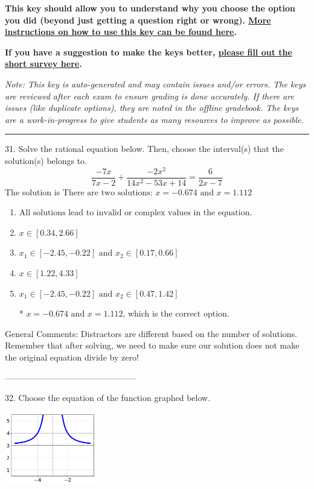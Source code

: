 \documentclass{article}[14pt]
\begin{document}
\textbf{This key should allow you to understand why you choose the option you did (beyond just getting a question right or wrong). \href{https://xronos.clas.ufl.edu/mac1105spring2020/courseDescriptionAndMisc/Exams/LearningFromResults}{More instructions on how to use this key can be found here}.}

\textbf{If you have a suggestion to make the keys better, \href{https://forms.gle/CZkbZmPbC9XALEE88}{please fill out the short survey here}.}

\textit{Note: This key is auto-generated and may contain issues and/or errors. The keys are reviewed after each exam to ensure grading is done accurately. If there are issues (like duplicate options), they are noted in the offline gradebook. The keys are a work-in-progress to give students as many resources to improve as possible.}

\rule{\textwidth}{0.4pt}

31. Solve the rational equation below. Then, choose the interval(s) that the solution(s) belongs to.
$$ \frac{-7x}{7x -2} + \frac{-2x^{2}}{14x^{2} -53 x + 14} = \frac{6}{2x -7} $$ 
The solution is $ \text{There are two solutions: } x = -0.674 \text{ and } x = 1.112 $ 

\begin{enumerate}[label=\Alph*.] 
\item $ \text{All solutions lead to invalid or complex values in the equation.} $ 

  
\item $ x \in [0.34,2.66] $ 

  
\item $ x_1 \in [-2.45, -0.22] \text{ and } x_2 \in [0.17,0.66] $ 

  
\item $ x \in [1.22,4.33] $ 

  
\item $ x_1 \in [-2.45, -0.22] \text{ and } x_2 \in [0.47,1.42] $ 

 * $x = -0.674 \text{ and } x = 1.112$, which is the correct option. 
\end{enumerate} 
 
General Comments: Distractors are different based on the number of solutions. Remember that after solving, we need to make sure our solution does not make the original equation divide by zero!

-----------------------------------------------

32. Choose the equation of the function graphed below.
\begin{center} \includegraphics[width=0.3\textwidth]{../Figures/rationalGraphToEquationC.png} \end{center} 
\end{document}
